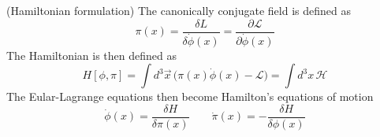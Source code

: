 \vspace{2ex}
\begin{thm}
(Hamiltonian formulation) The canonically conjugate field is defined as
\[\pi(x)=\dfrac{\delta L}{\delta \dot{\phi }(x)}=\dfrac{\partial \mathcal{L}}{\partial \dot{\phi }(x)} \]
The Hamiltonian is then defined as
	\[H[\phi ,\pi ]=\int d^3\vec{x}\,\Big(\pi (x)\dot{\phi }(x)-\mathcal{L}\Big)=\int d^3x\,\mathcal{H}\]
The Eular-Lagrange equations then become Hamilton's equations of motion
	\[\dot{\phi }(x)=\dfrac{\delta H}{\delta \pi (x)}\qquad \dot{\pi }(x)=-\dfrac{\delta H}{\delta \phi (x)}\]
\end{thm}
\vspace{2ex}

